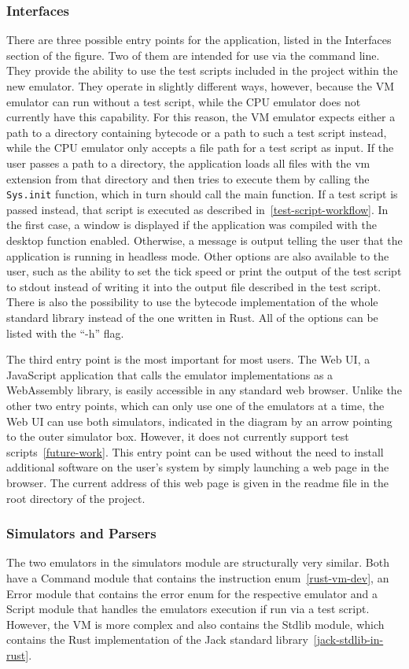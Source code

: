 \subsubsection{Interfaces} \label{interfaces}
There are three possible entry points for the application, listed in the Interfaces section of the figure. Two of them are intended for use via the command line. They provide the ability to use the test scripts included in the project within the new emulator.
They operate in slightly different ways, however, because the VM emulator can run without a test script, while the CPU emulator does not currently have this capability.
For this reason, the VM emulator expects either a path to a directory containing bytecode or a path to such a test script instead, while the CPU emulator only accepts a file path for a test script as input.
If the user passes a path to a directory, the application loads all files with the vm extension from that directory and then tries to execute them by calling the \verb+Sys.init+ function, which in turn should call the main function. If a test script is passed instead, that script is executed as described in~\cref{test-script-workflow}.
In the first case, a window is displayed if the application was compiled with the desktop function enabled. Otherwise, a message is output telling the user that the application is running in headless mode.
Other options are also available to the user, such as the ability to set the tick speed or print the output of the test script to stdout instead of writing it into the output file described in the test script.
There is also the possibility to use the bytecode implementation of the whole standard library instead of the one written in Rust.
All of the options can be listed with the ``-h'' flag.

The third entry point is the most important for most users. The Web UI, a JavaScript application that calls the emulator implementations as a WebAssembly library, is easily accessible in any standard web browser.
Unlike the other two entry points, which can only use one of the emulators at a time, the Web UI can use both simulators, indicated in the diagram by an arrow pointing to the outer simulator box. However, it does not currently support test scripts~\ref{future-work}.
This entry point can be used without the need to install additional software on the user's system by simply launching a web page in the browser. The current address of this web page is given in the readme file in the root directory of the project.


\subsubsection{Simulators and Parsers}
The two emulators in the simulators module are structurally very similar. Both have a Command module that contains the instruction enum~\ref{rust-vm-dev}, an Error module that contains the error enum for the respective emulator and a Script module that handles the emulators execution if run via a test script.
However, the VM is more complex and also contains the Stdlib module, which contains the Rust implementation of the Jack standard library~\ref{jack-stdlib-in-rust}.

